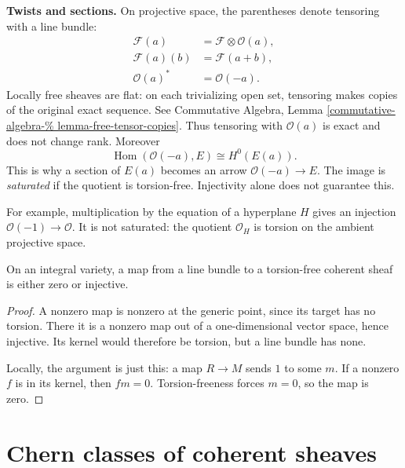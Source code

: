 \medskip\noindent
\textbf{Twists and sections.}
On projective space, the parentheses
denote tensoring with a line bundle:
$$
\begin{aligned}
\mathcal{F}(a)&=
\mathcal{F}\otimes\mathcal{O}(a),\\
\mathcal{F}(a)(b)&=\mathcal{F}(a+b),\\
\mathcal{O}(a)^*&=\mathcal{O}(-a).
\end{aligned}
$$
Locally free sheaves are flat: on each
trivializing open set, tensoring makes
copies of the original exact sequence.
See Commutative Algebra, Lemma
\ref{commutative-algebra-%
lemma-free-tensor-copies}.
Thus tensoring with $\mathcal{O}(a)$ is
exact and does not change rank. Moreover
$$
\operatorname{Hom}(\mathcal{O}(-a),E)
\cong H^0(E(a)).
$$
This is why a section of $E(a)$ becomes
an arrow $\mathcal{O}(-a)\to E$.
The image is \emph{saturated} if the
quotient is torsion-free. Injectivity
alone does not guarantee this.

For example, multiplication by the
equation of a hyperplane $H$ gives an
injection $\mathcal{O}(-1)\to\mathcal{O}$.
It is not saturated: the quotient
$\mathcal{O}_H$ is torsion on the
ambient projective space.

\begin{lemma}
\label{lemma-line-to-torsion-free}
On an integral variety, a map from a
line bundle to a torsion-free coherent
sheaf is either zero or injective.
\end{lemma}

\begin{proof}
A nonzero map is nonzero at the generic
point, since its target has no torsion.
There it is a nonzero map out of a
one-dimensional vector space, hence
injective. Its kernel would therefore
be torsion, but a line bundle has none.

Locally, the argument is just this:
a map $R\to M$ sends $1$ to some $m$.
If a nonzero $f$ is in its kernel, then
$fm=0$. Torsion-freeness forces $m=0$,
so the map is zero.
\end{proof}

\section{Chern classes of coherent sheaves}
\label{section-chern-coherent-sheaves}

